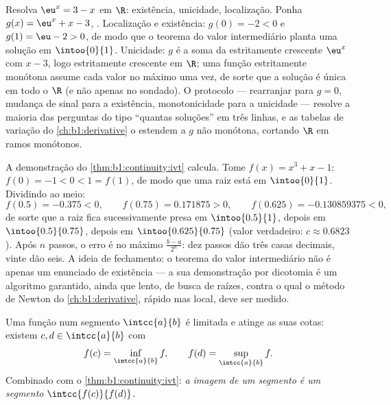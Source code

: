 \begin{example}\label{ex:b1:continuity:protocol}
Resolva $\eu^x = 3 - x$ em $\R$: existência, unicidade,
localização. Ponha $g(x) = \eu^x + x - 3$, . Localização e
existência: $g(0) = -2 < 0$ e $g(1) = \eu - 2 > 0$, de modo que o
teorema do valor intermediário planta uma solução em
$\intoo{0}{1}$. Unicidade: $g$ é a soma da estritamente
crescente $\eu^x$ com $x - 3$, logo estritamente crescente em
$\R$; uma função estritamente monótona assume cada valor no máximo
uma vez, de sorte que a solução é única em todo o $\R$ (e não apenas
no  sondado). O protocolo --- rearranjar para $g = 0$, mudança
de sinal para a existência, monotonicidade para a unicidade --- resolve
a maioria das perguntas do tipo ``quantas soluções'' em três linhas, e
as tabelas de variação do \cref{ch:b1:derivative}
o estendem a $g$ não monótona, cortando $\R$ em ramos monótonos.
\end{example}

\begin{example}\label{ex:b1:continuity:dichotomy}
A demonstração do \cref{thm:b1:continuity:ivt} calcula. Tome $f(x) =
x^3 + x - 1$: $f(0) = -1 < 0 < 1 = f(1)$, de modo que uma raiz está em
$\intoo{0}{1}$. Dividindo ao meio:
\[
f(0.5) = -0.375 < 0, \qquad
f(0.75) = 0.171875 > 0, \qquad
f(0.625) = -0.130859375 < 0 ,
\]
de sorte que a raiz fica sucessivamente presa em $\intoo{0.5}{1}$, depois em
$\intoo{0.5}{0.75}$, depois em $\intoo{0.625}{0.75}$ (valor verdadeiro:
$c \approx 0.6823$). Após $n$ passos, o erro é no máximo
$\frac{b - a}{2^n}$: dez passos dão três casas decimais, vinte dão
seis. A ideia de fechamento: o teorema do valor intermediário não é
apenas um enunciado de existência --- a sua demonstração por dicotomia
é um algoritmo garantido, ainda que lento, de busca de raízes, contra o
qual o método de Newton do \cref{ch:b1:derivative}, rápido mas local,
deve ser medido.
\end{example}

\begin{theorem}\label{thm:b1:continuity:evt}
Uma função  num segmento $\intcc{a}{b}$ é limitada e
atinge as suas cotas: existem $c, d \in \intcc{a}{b}$ com
\[
f(c) = \inf_{\intcc{a}{b}} f,
\qquad
f(d) = \sup_{\intcc{a}{b}} f .
\]
Combinado com o \cref{thm:b1:continuity:ivt}: \emph{a imagem 
de um segmento é um segmento} $\intcc{f(c)}{f(d)}$.
\end{theorem}

